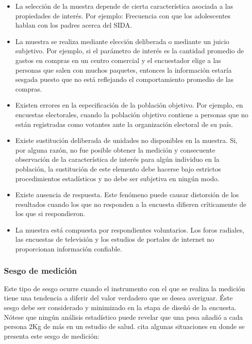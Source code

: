 \documentclass[
  10pt,
  spanish,
]{book}
\providecommand{\tightlist}{%
  \setlength{\itemsep}{0pt}\setlength{\parskip}{0pt}}
\begin{document}
\begin{itemize}
\tightlist
\item
  La selección de la muestra depende de cierta característica asociada a las propiedades de interés. Por ejemplo: Frecuencia con que los adolescentes hablan con los padres acerca del SIDA.
\item
  La muestra se realiza mediante elección deliberada o mediante un juicio subjetivo. Por ejemplo, si el parámetro de interés es la cantidad promedio de gastos en compras en un centro comercial y el encuestador elige a las personas que salen con muchos paquetes, entonces la información estaría sesgada puesto que no está reflejando el comportamiento promedio de las compras.
\item
  Existen errores en la especificación de la población objetivo. Por ejemplo, en encuestas electorales, cuando la población objetivo contiene a personas que no están registradas como votantes ante la organización electoral de su país.
\item
  Existe sustitución deliberada de unidades no disponibles en la muestra. Si, por alguna razón, no fue posible obtener la medición y consecuente observación de la característica de interés para algún individuo en la población, la sustitución de este elemento debe hacerse bajo estrictos procedimientos estadísticos y no debe ser subjetiva en ningún modo.
\item
  Existe ausencia de respuesta. Este fenómeno puede causar distorsión de los resultados cuando los que no responden a la encuesta difieren críticamente de los que si respondieron.
\item
  La muestra está compuesta por respondientes voluntarios. Los foros radiales, las encuestas de televisión y los estudios de portales de internet no proporcionan información confiable.
\end{itemize}

\hypertarget{sesgo-de-mediciuxf3n}{%
\subsubsection*{Sesgo de medición}\label{sesgo-de-mediciuxf3n}}

Este tipo de sesgo ocurre cuando el instrumento con el que se realiza la medición tiene una tendencia a diferir del valor verdadero que se desea averiguar. Éste sesgo debe ser considerado y minimizado en la etapa de diseñó de la encuesta. Nótese que ningún análisis estadístico puede revelar que una pesa añadió a cada persona 2Kg de más en un estudio de salud. \citet{Loh} cita algunas situaciones en donde se presenta este sesgo de medición:
\end{document}
